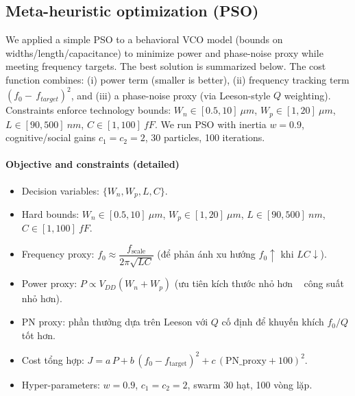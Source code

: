 \subsection*{Meta-heuristic optimization (PSO)}
We applied a simple PSO to a behavioral VCO model (bounds on widths/length/capacitance) to minimize power and phase-noise proxy while meeting frequency targets. The best solution is summarized below.
The cost function combines: (i) power term (smaller is better), (ii) frequency tracking term $(f_0-\,f_{target})^2$, and (iii) a phase-noise proxy (via Leeson-style $Q$ weighting). Constraints enforce technology bounds: $W_n\in[0.5,10]~\mu m$, $W_p\in[1,20]~\mu m$, $L\in[90,500]~nm$, $C\in[1,100]~fF$.
We run PSO with inertia $w=0.9$, cognitive/social gains $c_1=c_2=2$, 30 particles, 100 iterations.

\paragraph{Objective and constraints (detailed)}
\begin{itemize}
  \item Decision variables: $\{W_n, W_p, L, C\}$.
  \item Hard bounds: $W_n\in[0.5,10]~\mu m$, $W_p\in[1,20]~\mu m$, $L\in[90,500]~nm$, $C\in[1,100]~fF$.
  \item Frequency proxy: $f_0 \approx \dfrac{f_{\text{scale}}}{2\pi\sqrt{LC}}$ (để phản ánh xu hướng $f_0 \uparrow$ khi $LC \downarrow$).
  \item Power proxy: $P \propto V_{DD}(W_n+W_p)$ (ưu tiên kích thước nhỏ hơn ~ công suất nhỏ hơn).
  \item PN proxy: phần thưởng dựa trên Leeson với $Q$ cố định để khuyến khích $f_0/Q$ tốt hơn.
  \item Cost tổng hợp: $J = a\,P + b\,(f_0-f_{\text{target}})^2 + c\,(\text{PN\_proxy}+100)^2$.
  \item Hyper-parameters: $w=0.9$, $c_1=c_2=2$, swarm 30 hạt, 100 vòng lặp.
\end{itemize}

